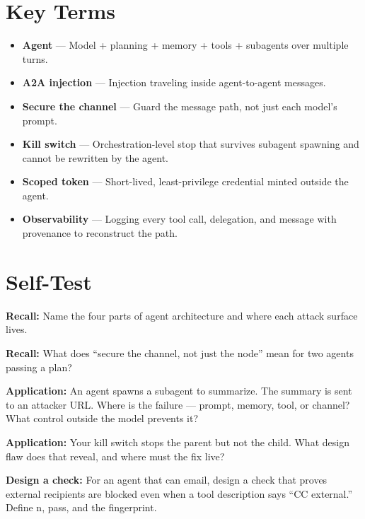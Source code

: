 \section{Key Terms}
\begin{itemize}
\item \textbf{Agent} — Model + planning + memory + tools + subagents over multiple turns.
\item \textbf{A2A injection} — Injection traveling inside agent-to-agent messages.
\item \textbf{Secure the channel} — Guard the message path, not just each model's prompt.
\item \textbf{Kill switch} — Orchestration-level stop that survives subagent spawning and cannot be rewritten by the agent.
\item \textbf{Scoped token} — Short-lived, least-privilege credential minted outside the agent.
\item \textbf{Observability} — Logging every tool call, delegation, and message with provenance to reconstruct the path.
\end{itemize}

\section{Self-Test}
\begin{selftest}
\item \textbf{Recall:} Name the four parts of agent architecture and where each attack surface lives.
\item \textbf{Recall:} What does ``secure the channel, not just the node'' mean for two agents passing a plan?
\item \textbf{Application:} An agent spawns a subagent to summarize. The summary is sent to an attacker URL. Where is the failure — prompt, memory, tool, or channel? What control outside the model prevents it?
\item \textbf{Application:} Your kill switch stops the parent but not the child. What design flaw does that reveal, and where must the fix live?
\item \textbf{Design a check:} For an agent that can email, design a check that proves external recipients are blocked even when a tool description says ``CC external.'' Define n, pass, and the fingerprint.
\end{selftest}


